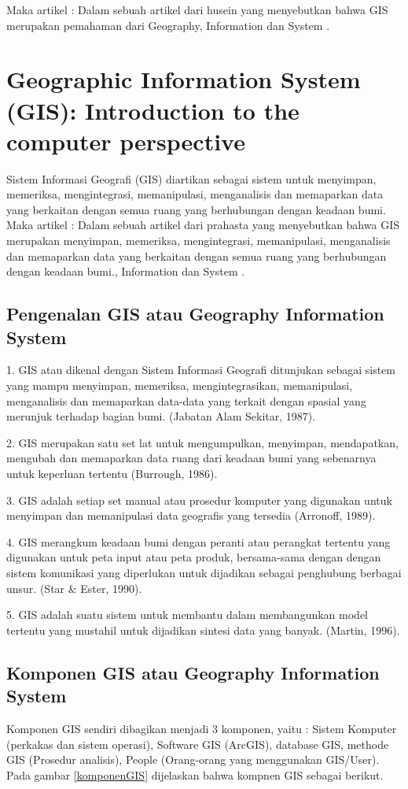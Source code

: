 Maka artikel :
	Dalam sebuah artikel dari husein yang menyebutkan bahwa  GIS merupakan pemahaman dari
	Geography, Information dan System \cite{husein2006konsep}.

\section{Geographic Information System (GIS): Introduction to the computer perspective}
Sistem Informasi Geografi (GIS) diartikan sebagai sistem untuk menyimpan, memeriksa, 
mengintegrasi, memanipulasi, menganalisis dan memaparkan data yang berkaitan dengan semua 
ruang yang berhubungan dengan keadaan bumi.
Maka artikel :
	Dalam sebuah artikel dari prahasta yang menyebutkan bahwa  GIS merupakan menyimpan, memeriksa, mengintegrasi, memanipulasi, menganalisis dan memaparkan data yang berkaitan dengan semua ruang yang berhubungan dengan keadaan bumi., Information dan System \cite{prahasta2009sistem}.

\subsection{Pengenalan GIS atau Geography Information System}
1. GIS atau dikenal dengan Sistem Informasi Geografi ditunjukan sebagai sistem yang mampu menyimpan, memeriksa, mengintegrasikan, memanipulasi, menganalisis dan memaparkan data-data yang terkait dengan spasial yang merunjuk terhadap bagian bumi. (Jabatan Alam Sekitar, 1987).

2. GIS merupakan satu set lat untuk mengumpulkan, menyimpan, mendapatkan, mengubah dan memaparkan data ruang dari keadaan  bumi yang sebenarnya untuk keperluan tertentu (Burrough, 1986).

3. GIS adalah setiap set manual atau prosedur komputer yang digunakan untuk menyimpan dan memanipulasi data geografis yang tersedia (Arronoff, 1989).

4. GIS merangkum keadaan bumi dengan peranti atau perangkat tertentu yang digunakan untuk peta input atau peta produk, bersama-sama dengan dengan sistem komunikasi yang diperlukan untuk dijadikan sebagai penghubung berbagai unsur. (Star \& Ester, 1990).

5. GIS adalah suatu sistem untuk membantu dalam membangunkan model tertentu yang mustahil untuk dijadikan sintesi data yang banyak. (Martin, 1996).

\subsection{Komponen GIS atau Geography Information System}
Komponen GIS sendiri dibagikan menjadi 3 komponen, yaitu :
Sistem Komputer (perkakas dan sistem operasi), Software GIS
(ArcGIS), database GIS, methode GIS (Prosedur analisis), People (Orang-orang yang menggunakan GIS/User).
Pada gambar \ref{komponenGIS} dijelaskan bahwa kompnen GIS sebagai berikut.


